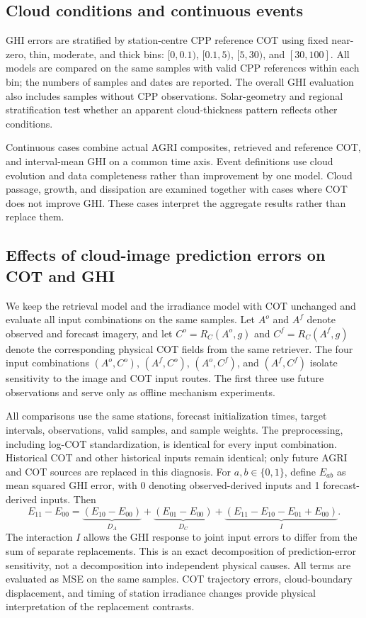 \documentclass[11pt]{article}
\begin{document}
\subsection{Cloud conditions and continuous events}
GHI errors are stratified by station-centre CPP reference COT using fixed near-zero, thin, moderate, and thick bins: $[0,0.1)$, $[0.1,5)$, $[5,30)$, and $[30,100]$. All models are compared on the same samples with valid CPP references within each bin; the numbers of samples and dates are reported. The overall GHI evaluation also includes samples without CPP observations. Solar-geometry and regional stratification test whether an apparent cloud-thickness pattern reflects other conditions.

Continuous cases combine actual AGRI composites, retrieved and reference COT, and interval-mean GHI on a common time axis. Event definitions use cloud evolution and data completeness rather than improvement by one model. Cloud passage, growth, and dissipation are examined together with cases where COT does not improve GHI. These cases interpret the aggregate results rather than replace them.

\subsection{Effects of cloud-image prediction errors on COT and GHI}
We keep the retrieval model and the irradiance model with COT unchanged and evaluate all input combinations on the same samples. Let $A^o$ and $A^f$ denote observed and forecast imagery, and let $C^o=R_C(A^o,g)$ and $C^f=R_C(A^f,g)$ denote the corresponding physical COT fields from the same retriever. The four input combinations $(A^o,C^o)$, $(A^f,C^o)$, $(A^o,C^f)$, and $(A^f,C^f)$ isolate sensitivity to the image and COT input routes. The first three use future observations and serve only as offline mechanism experiments.

All comparisons use the same stations, forecast initialization times, target intervals, observations, valid samples, and sample weights. The preprocessing, including log-COT standardization, is identical for every input combination. Historical COT and other historical inputs remain identical; only future AGRI and COT sources are replaced in this diagnosis. For $a,b\in\{0,1\}$, define $E_{ab}$ as mean squared GHI error, with 0 denoting observed-derived inputs and 1 forecast-derived inputs. Then
\begin{equation}
E_{11}-E_{00}=\underbrace{(E_{10}-E_{00})}_{D_A}
+\underbrace{(E_{01}-E_{00})}_{D_C}
+\underbrace{(E_{11}-E_{10}-E_{01}+E_{00})}_{I}.
\label{eq:propagation}
\end{equation}
The interaction $I$ allows the GHI response to joint input errors to differ from the sum of separate replacements. This is an exact decomposition of prediction-error sensitivity, not a decomposition into independent physical causes. All terms are evaluated as MSE on the same samples. COT trajectory errors, cloud-boundary displacement, and timing of station irradiance changes provide physical interpretation of the replacement contrasts.
\end{document}
